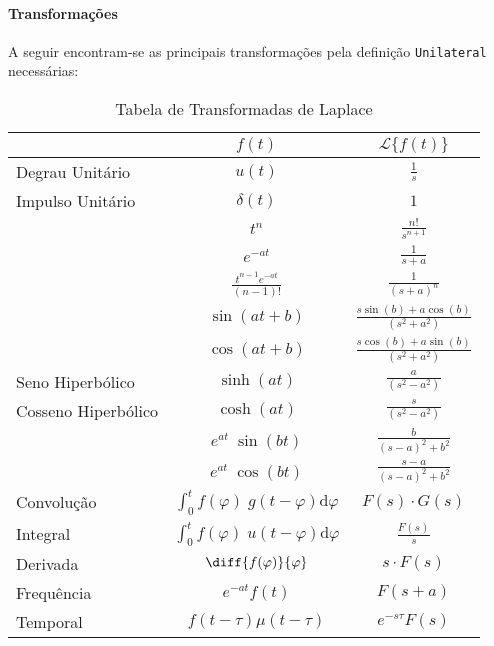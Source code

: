 \documentclass{article}
\begin{document}
        \paragraph{Transformações}A seguir encontram-se as principais transformações pela definição \texttt{Unilateral} necessárias:
            \begin{table}[H]
                \centering
                \begingroup
                \renewcommand{\arraystretch}{1.25}
                \begin{tabular}[]{lcc}
                                        & $f(t)$      & $\mathcal{L}\{ f(t) \}$\\\hline
                    Degrau Unitário  & $u(t)$      & $\frac{1}{s}$\\
                    Impulso Unitário & $\delta(t)$ & $1$\\
                                        & $t^{n}$     & $\frac{n!}{s^{n+1}}$\\
                                        & $e^{-at}$   & $\frac{1}{s+a}$\\
                                        & $\frac{t^{n-1}e^{-at}}{(n-1)!}$  & $\frac{1}{(s+a)^{n}}$\\
                                        & $\sin(at + b)$  & $\frac{s\sin(b) + a\cos(b)}{(s^2+a^2)}$\\
                                        & $\cos(at + b)$  & $\frac{s\cos(b) + a\sin(b)}{(s^2+a^2)}$\\
                    Seno Hiperbólico    & $\sinh(at)$  & $\frac{a}{(s^2-a^2)}$\\
                    Cosseno Hiperbólico & $\cosh(at)$  & $\frac{s}{(s^2-a^2)}$\\
                                        & $e^{at}\;\sin(bt)$  & $\frac{b}{(s-a)^2+b^2}$\\
                                        & $e^{at}\;\cos(bt)$  & $\frac{s-a}{(s-a)^2+b^2}$\\
                    Convolução       & $\int_{0}^{t} f(\varphi)\;g(t - \varphi) \text{d}\varphi$ & $F(s)\cdot G(s)$\\
                    Integral         & $\int_{0}^{t} f(\varphi)\;u(t - \varphi) \text{d}\varphi$ & $\frac{F(s)}{s}$\\
                    Derivada         & $\diff{f(\varphi)}{\varphi}$ & $s\cdot F(s)$\\
                    Frequência       & $e^{-at}f(t)$          & $F(s+a)$\\
                    Temporal         & $f(t-\tau)\mu(t-\tau)$ & $e^{-s\tau}F(s)$\\\hline
                \end{tabular}
                \endgroup
                \caption{Tabela de Transformadas de Laplace}\label{table:Laplace}
            \end{table} \noindent
\end{document}
